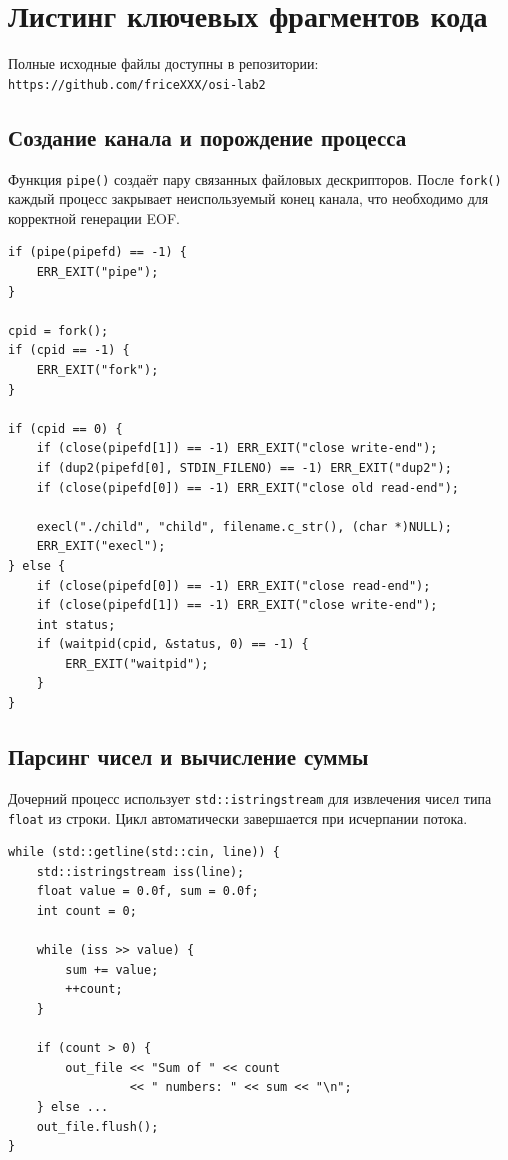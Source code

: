 \documentclass[11pt, a4paper]{article}
\begin{document}
\section{Листинг ключевых фрагментов кода}
Полные исходные файлы доступны в репозитории: \texttt{https://github.com/friceXXX/osi-lab2}

\subsection{Создание канала и порождение процесса}
Функция \texttt{pipe()} создаёт пару связанных файловых дескрипторов. После \texttt{fork()} каждый процесс закрывает неиспользуемый конец канала, что необходимо для корректной генерации EOF.

\begin{lstlisting}[caption={Создание канала и fork}, label={lst:pipe}]
if (pipe(pipefd) == -1) {
    ERR_EXIT("pipe");
}

cpid = fork();
if (cpid == -1) {
    ERR_EXIT("fork");
}

if (cpid == 0) {
    if (close(pipefd[1]) == -1) ERR_EXIT("close write-end");
    if (dup2(pipefd[0], STDIN_FILENO) == -1) ERR_EXIT("dup2");
    if (close(pipefd[0]) == -1) ERR_EXIT("close old read-end");

    execl("./child", "child", filename.c_str(), (char *)NULL);
    ERR_EXIT("execl");
} else {
    if (close(pipefd[0]) == -1) ERR_EXIT("close read-end");
    if (close(pipefd[1]) == -1) ERR_EXIT("close write-end");
    int status;
    if (waitpid(cpid, &status, 0) == -1) {
        ERR_EXIT("waitpid");
    }
}
\end{lstlisting}

\subsection{Парсинг чисел и вычисление суммы}
Дочерний процесс использует \texttt{std::istringstream} для извлечения чисел типа \texttt{float} из строки. Цикл автоматически завершается при исчерпании потока.

\begin{lstlisting}[caption={Парсинг float и подсчет суммы}, label={lst:parse}]
while (std::getline(std::cin, line)) {
    std::istringstream iss(line);
    float value = 0.0f, sum = 0.0f;
    int count = 0;
    
    while (iss >> value) {
        sum += value;
        ++count;
    }
    
    if (count > 0) {
        out_file << "Sum of " << count 
                 << " numbers: " << sum << "\n";
    } else ...
    out_file.flush();
}
\end{lstlisting}
\end{document}

